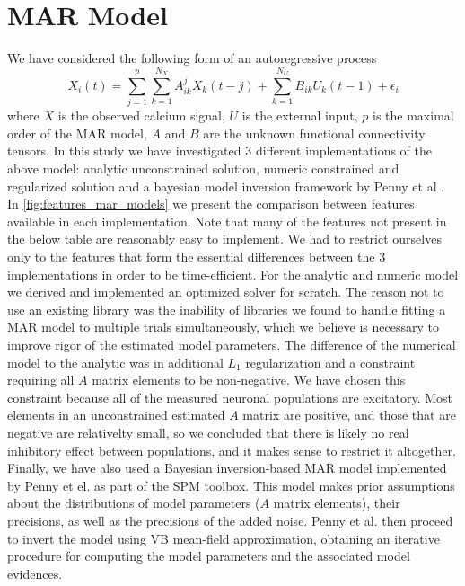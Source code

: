 \documentclass[a4paper,10pt]{article}
\begin{document}
\section{MAR Model}

We have considered the following form of an autoregressive process
\begin{equation}
  X_i(t) = \sum_{j=1}^p \sum_{k=1}^{N_X}   A^j_{ik} X_k(t-j) + \sum_{k=1}^{N_U} B_{ik} U_k(t-1) + \epsilon_i 
\end{equation}
where $X$ is the observed calcium signal, $U$ is the external input, $p$ is the maximal order of the MAR model, $A$ and $B$ are the unknown functional connectivity tensors. In this study we have investigated 3 different implementations of the above model: analytic unconstrained solution, numeric constrained and regularized solution and a bayesian model inversion framework by Penny et al \cite{penny_bayesian_2002}. In \cref{fig:features_mar_models} we present the comparison between features available in each implementation. Note that many of the features not present in the below table are reasonably easy to implement. We had to restrict ourselves only to the features that form the essential differences between the 3 implementations in order to be time-efficient. For the analytic and numeric model we derived and implemented an optimized solver for scratch. The reason not to use an existing library was the inability of libraries we found to handle fitting a MAR model to multiple trials simultaneously, which we believe is necessary to improve rigor of the estimated model parameters. The difference of the numerical model to the analytic was in additional $L_1$ regularization and a constraint requiring all $A$ matrix elements to be non-negative. We have chosen this constraint because all of the measured neuronal populations are excitatory. Most elements in an unconstrained estimated $A$ matrix are positive, and those that are negative are relativelty small, so we concluded that there is likely no real inhibitory effect between populations, and it makes sense to restrict it altogether. Finally, we have also used a Bayesian inversion-based MAR model implemented by Penny et el. \cite{penny_bayesian_2002} as part of the SPM toolbox. This model makes prior assumptions about the distributions of model parameters ($A$ matrix elements), their precisions, as well as the precisions of the added noise. Penny et al. \cite{penny_bayesian_2002} then proceed to invert the model using VB mean-field approximation, obtaining an iterative procedure for computing the model parameters and the associated model evidences.
\end{document}
